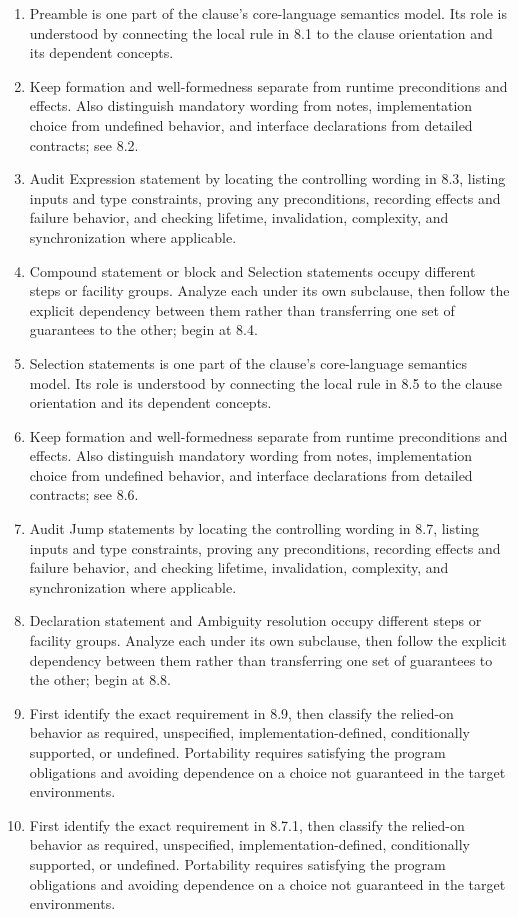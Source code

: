 \documentclass[11pt,letterpaper]{article}
\begin{document}
\begin{enumerate}
\item Preamble is one part of the clause's core-language semantics model. Its role is understood by connecting the local rule in 8.1 to the clause orientation and its dependent concepts.
\item Keep formation and well-formedness separate from runtime preconditions and effects. Also distinguish mandatory wording from notes, implementation choice from undefined behavior, and interface declarations from detailed contracts; see 8.2.
\item Audit Expression statement by locating the controlling wording in 8.3, listing inputs and type constraints, proving any preconditions, recording effects and failure behavior, and checking lifetime, invalidation, complexity, and synchronization where applicable.
\item Compound statement or block and Selection statements occupy different steps or facility groups. Analyze each under its own subclause, then follow the explicit dependency between them rather than transferring one set of guarantees to the other; begin at 8.4.
\item Selection statements is one part of the clause's core-language semantics model. Its role is understood by connecting the local rule in 8.5 to the clause orientation and its dependent concepts.
\item Keep formation and well-formedness separate from runtime preconditions and effects. Also distinguish mandatory wording from notes, implementation choice from undefined behavior, and interface declarations from detailed contracts; see 8.6.
\item Audit Jump statements by locating the controlling wording in 8.7, listing inputs and type constraints, proving any preconditions, recording effects and failure behavior, and checking lifetime, invalidation, complexity, and synchronization where applicable.
\item Declaration statement and Ambiguity resolution occupy different steps or facility groups. Analyze each under its own subclause, then follow the explicit dependency between them rather than transferring one set of guarantees to the other; begin at 8.8.
\item First identify the exact requirement in 8.9, then classify the relied-on behavior as required, unspecified, implementation-defined, conditionally supported, or undefined. Portability requires satisfying the program obligations and avoiding dependence on a choice not guaranteed in the target environments.
\item First identify the exact requirement in 8.7.1, then classify the relied-on behavior as required, unspecified, implementation-defined, conditionally supported, or undefined. Portability requires satisfying the program obligations and avoiding dependence on a choice not guaranteed in the target environments.
\end{enumerate}
\end{document}

